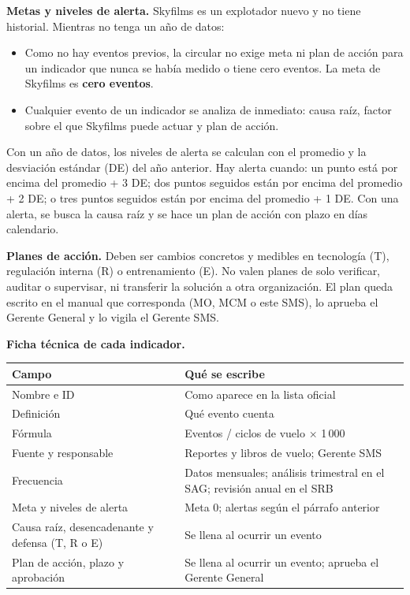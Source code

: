 \textbf{Metas y niveles de alerta.} Skyfilms es un explotador nuevo y no tiene historial. Mientras no tenga un año de datos:
\begin{itemize}
    \item Como no hay eventos previos, la circular no exige meta ni plan de acción para un indicador que nunca se había medido o tiene cero eventos. La meta de Skyfilms es \textbf{cero eventos}.
    \item Cualquier evento de un indicador se analiza de inmediato: causa raíz, factor sobre el que Skyfilms puede actuar y plan de acción.
\end{itemize}
Con un año de datos, los niveles de alerta se calculan con el promedio y la desviación estándar (DE) del año anterior. Hay alerta cuando: un punto está por encima del promedio + 3 DE; dos puntos seguidos están por encima del promedio + 2 DE; o tres puntos seguidos están por encima del promedio + 1 DE. Con una alerta, se busca la causa raíz y se hace un plan de acción con plazo en días calendario.

\textbf{Planes de acción.} Deben ser cambios concretos y medibles en tecnología (T), regulación interna (R) o entrenamiento (E). No valen planes de solo verificar, auditar o supervisar, ni transferir la solución a otra organización. El plan queda escrito en el manual que corresponda (MO, MCM o este SMS), lo aprueba el Gerente General y lo vigila el Gerente SMS.

\textbf{Ficha técnica de cada indicador.}
\begin{tabularx}{\textwidth}{|l|X|}
\hline
\rowcolor[gray]{0.9}\textbf{Campo} & \textbf{Qué se escribe} \\ \hline
Nombre e ID & Como aparece en la lista oficial \\ \hline
Definición & Qué evento cuenta \\ \hline
Fórmula & Eventos / ciclos de vuelo $\times$ 1\,000 \\ \hline
Fuente y responsable & Reportes y libros de vuelo; Gerente SMS \\ \hline
Frecuencia & Datos mensuales; análisis trimestral en el SAG; revisión anual en el SRB \\ \hline
Meta y niveles de alerta & Meta 0; alertas según el párrafo anterior \\ \hline
Causa raíz, desencadenante y defensa (T, R o E) & Se llena al ocurrir un evento \\ \hline
Plan de acción, plazo y aprobación & Se llena al ocurrir un evento; aprueba el Gerente General \\ \hline
\end{tabularx}

